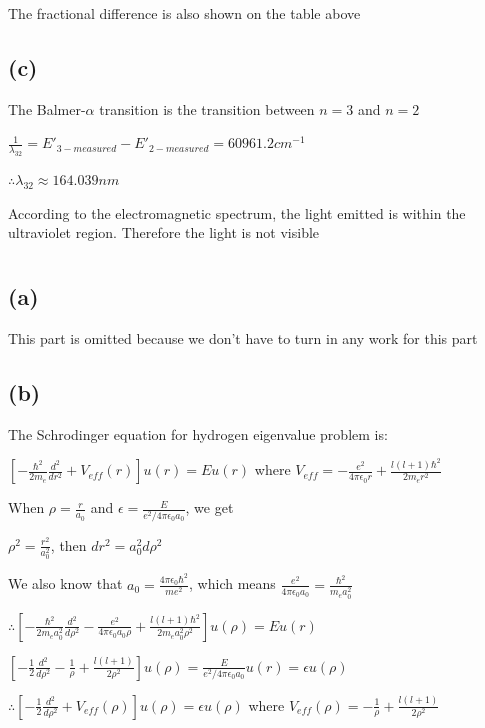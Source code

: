 \documentclass[12pt]{article}
\begin{document}
\begin{spacing}{2.0}
The fractional difference is also shown on the table above

\subsection*{(c)}
The Balmer-$\alpha$ transition is the transition between $n=3$ and $n=2$

$\frac{1}{\lambda_{32}}= E'_{3-measured}-E'_{2-measured}= 60961.2 cm^{-1}$

$\therefore \lambda_{32} \approx 164.039 nm$

According to the electromagnetic spectrum, the light emitted is within the ultraviolet region. Therefore the light is not visible

\section{} %

\subsection*{(a)}
This part is omitted because we don't have to turn in any work for this part

\subsection*{(b)}
The Schrodinger equation for hydrogen eigenvalue problem is:

$\left[ -\frac{\hbar^2}{2m_e} \frac{d^2}{dr^2} + V_{eff}(r) \right] u(r)=Eu(r)$ where $V_{eff}=-\frac{e^2}{4\pi \epsilon_0 r}+\frac{l(l+1)\hbar^2}{2m_er^2}$

When $\rho=\frac{r}{a_0}$ and $\epsilon=\frac{E}{e^2/4\pi \epsilon_0 a_0}$, we get

$\rho^2=\frac{r^2}{a_0^2}$, then $dr^2=a_0^2 d\rho^2$

We also know that $a_0=\frac{4\pi \epsilon_0 \hbar^2}{me^2}$, which means $\frac{e^2}{4\pi \epsilon_0 a_0}= \frac{\hbar^2}{m_e a_0^2}$

$\therefore \left[ -\frac{\hbar^2}{2m_e a_0^2} \frac{d^2}{d\rho^2} -\frac{e^2}{4\pi \epsilon_0 a_0\rho}+\frac{l(l+1)\hbar^2}{2m_e a_0^2\rho^2} \right] u(\rho)=Eu(r)$

$\left[ -\frac{1}{2} \frac{d^2}{d\rho^2} -\frac{1}{\rho}+\frac{l(l+1)}{2\rho^2} \right] u(\rho)=\frac{E}{e^2/4\pi \epsilon_0 a_0}u(r)=\epsilon u(\rho)$

$\therefore \left[ -\frac{1}{2} \frac{d^2}{d\rho^2} + V_{eff}(\rho) \right] u(\rho)=\epsilon u(\rho)$ where $V_{eff}(\rho)= -\frac{1}{\rho}+\frac{l(l+1)}{2\rho^2}$


\end{spacing}
\end{document}
